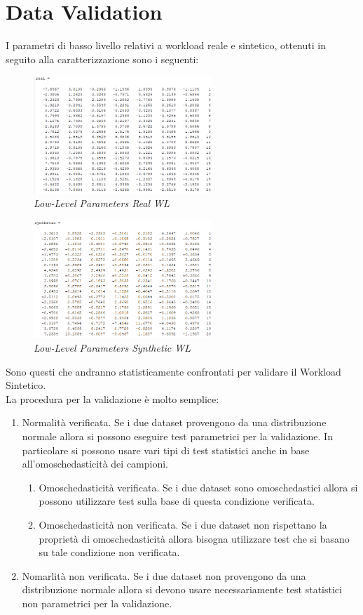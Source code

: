 \section{Data Validation}
I parametri di basso livello relativi a workload reale e sintetico, ottenuti in seguito alla caratterizzazione sono i seguenti:
\begin{figure}[H]
	\centering
	\includegraphics[width=0.6\textwidth]{img/hw3/real_wl.png}
	\caption{\textit{Low-Level Parameters Real WL}}
	\label{real}
\end{figure}
\begin{figure}[H]
	\centering
	\includegraphics[width=0.6\textwidth]{img/hw3/syn_wl.png}
	\caption{\textit{Low-Level Parameters Synthetic WL}}
	\label{syn}
\end{figure}
Sono questi che andranno statisticamente confrontati per validare il Workload Sintetico.
\\La procedura per la validazione è molto semplice:
\begin{enumerate}
	\item Normalità verificata. Se i due dataset provengono da una distribuzione normale allora si possono eseguire test parametrici per la validazione. In particolare si possono usare vari tipi di test statistici anche in base all'omoschedasticità dei campioni.
	\begin{enumerate}
		\item Omoschedasticità verificata. Se i due dataset sono omoschedastici allora si possono utilizzare test sulla base di questa condizione verificata.
		\item Omoschedasticità non verificata. Se i due dataset non rispettano la proprietà di omoschedasticità allora bisogna utilizzare test che si basano su tale condizione non verificata.
	\end{enumerate}
	\item Nomarlità non verificata. Se i due dataset non provengono da una distribuzione normale allora si devono usare necessariamente test statistici non parametrici per la validazione.
\end{enumerate}

